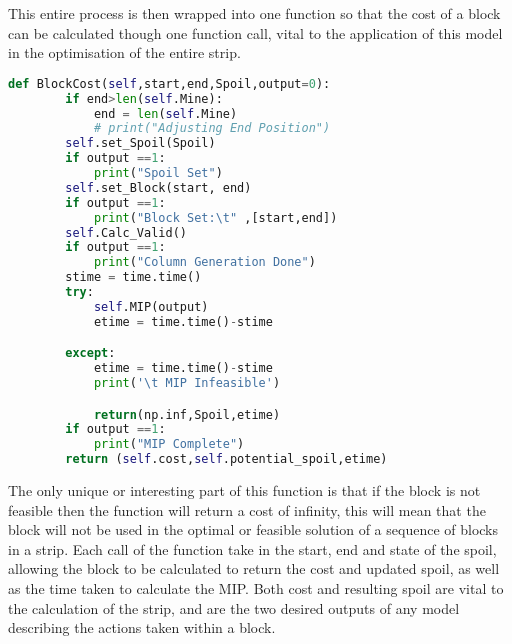 This entire process is then wrapped into one function so that the cost of a block can be calculated though one function call, vital to the application of this model in the optimisation of the entire strip. 
\begin{lstlisting}[language=python]
	def BlockCost(self,start,end,Spoil,output=0):
		if end>len(self.Mine):
			end = len(self.Mine)
			# print("Adjusting End Position")
		self.set_Spoil(Spoil)
		if output ==1:
			print("Spoil Set")
		self.set_Block(start, end)
		if output ==1:
			print("Block Set:\t" ,[start,end])
		self.Calc_Valid()
		if output ==1:
			print("Column Generation Done")
		stime = time.time()
		try:
			self.MIP(output)
			etime = time.time()-stime

		except:
			etime = time.time()-stime
			print('\t MIP Infeasible')

			return(np.inf,Spoil,etime)
		if output ==1:
			print("MIP Complete")
		return (self.cost,self.potential_spoil,etime)
		\end{lstlisting}
The only unique or interesting part of this function is that if the block is not feasible then the function will return a cost of infinity, this will mean that the block will not be used in the optimal or feasible solution of a sequence of blocks in a strip. Each call of the function take in the start, end and state of the spoil, allowing the block to be calculated to return the cost and updated spoil, as well as the time taken to calculate the MIP. Both cost and resulting spoil are vital to the calculation of the strip, and are the two desired outputs of any model describing the actions taken within a block. 
